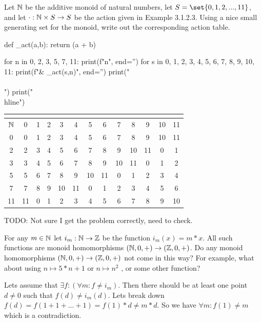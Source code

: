 \documentclass{article}
\begin{document}

Let $\mathbb{N}$ be the additive monoid of natural numbers, let $S = \set{0, 1, 2, ...,
11}$, and let $\cdot: \mathbb{N} \times S \to S$ be the action given in Example 3.1.2.3.
Using a nice small generating set for the monoid, write out the corresponding
action table.

\ans

\begin{python}
def _act(a,b):
  return (a + b) %

for n in {0, 2, 3, 5, 7, 11}:
  print(f"{n}", end='')
  for s in {0, 1, 2, 3, 4, 5, 6, 7, 8, 9, 10, 11}:
    print(f"& {_act(s,n)}", end='')
  print("\\\\")
  print("\\hline")
\end{python}

\begin{tabular}{|c||c|c|c|c|c|c|c|c|c|c|c|c|}
\hline
\multicolumn{13}{|c|}{} \\
\hline
$\mathbb{N}$ & 0 & 1 & 2 & 3 & 4 & 5 & 6 & 7 & 8 & 9 & 10 & 11 \\
\hline\hline
0& 0& 1& 2& 3& 4& 5& 6& 7& 8& 9& 10& 11\\
\hline
2& 2& 3& 4& 5& 6& 7& 8& 9& 10& 11& 0& 1\\
\hline
3& 3& 4& 5& 6& 7& 8& 9& 10& 11& 0& 1& 2\\
\hline
5& 5& 6& 7& 8& 9& 10& 11& 0& 1& 2& 3& 4\\
\hline
7& 7& 8& 9& 10& 11& 0& 1& 2& 3& 4& 5& 6\\
\hline
11& 11& 0& 1& 2& 3& 4& 5& 6& 7& 8& 9& 10\\
\hline
\end{tabular}

TODO: Not sure I get the problem correctly, need to check.



For any $m \in \mathbb{N}$ let $i_m : \mathbb{N} \to \mathbb{Z}$ be the function $i_m(x) = m*x$. All
such functions are monoid homomorphisms $(\mathbb{N},0,+) \to (\mathbb{Z},0,+)$. Do any monoid
homomorphisms $(\mathbb{N}, 0, +) \to (\mathbb{Z}, 0, +)$ not come in this way? For example,
what about using $n \mapsto 5*n + 1$ or $n \mapsto n^2$ , or some other
function?

\ans

Lets assume that $\exists f : (\forall m :f \ne i_m)$. Then there should be at
least one point $d \ne 0$ such that $f(d) \ne i_m(d)$. Lets break down $f(d) =
f(1 + 1 + ... + 1) = f(1)*d \ne m*d$. So we have $\forall m : f(1) \ne m$
which is a contradiction.
\end{document}
